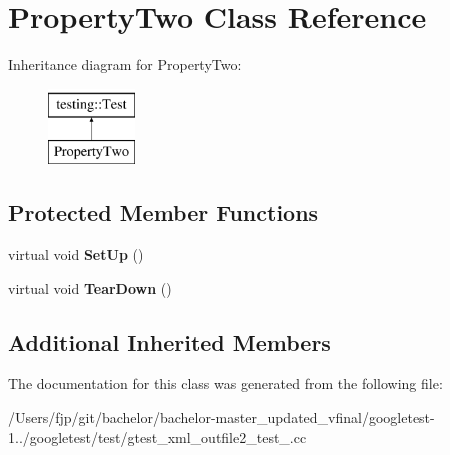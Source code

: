 \hypertarget{class_property_two}{}\section{Property\+Two Class Reference}
\label{class_property_two}
Inheritance diagram for Property\+Two\+:\begin{figure}[H]
\begin{center}
\leavevmode
\includegraphics[height=2.000000cm]{class_property_two}
\end{center}
\end{figure}
\subsection*{Protected Member Functions}
\begin{DoxyCompactItemize}
\item 
\mbox{\label{class_property_two_aa3ab39cf4e6c751cb0788c575bf92ca2}} 
virtual void {\bfseries Set\+Up} ()
\item 
\mbox{\label{class_property_two_aa4ffb2b9dddeba69f0f9baf133f06ef2}} 
virtual void {\bfseries Tear\+Down} ()
\end{DoxyCompactItemize}
\subsection*{Additional Inherited Members}


The documentation for this class was generated from the following file\+:\begin{DoxyCompactItemize}
\item 
/\+Users/fjp/git/bachelor/bachelor-\/master\+\_\+updated\+\_\+vfinal/googletest-\/1../googletest/test/gtest\+\_\+xml\+\_\+outfile2\+\_\+test\+\_\+.\+cc\end{DoxyCompactItemize}
